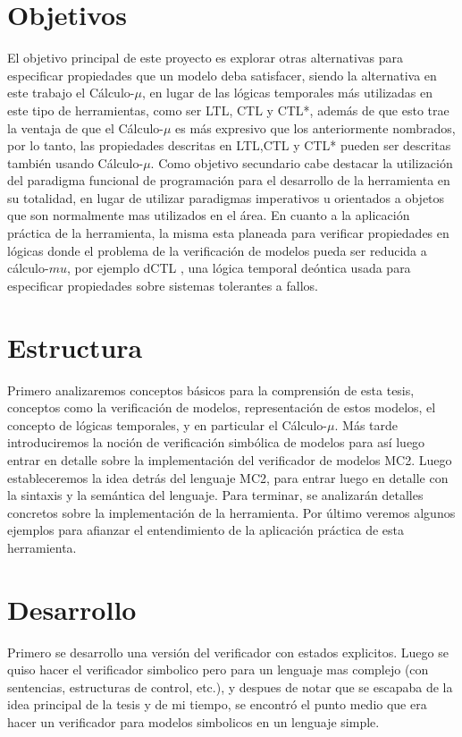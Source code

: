 \section{Objetivos}
El objetivo principal de este proyecto es explorar otras alternativas para especificar propiedades que un modelo deba satisfacer, siendo la alternativa en este trabajo el Cálculo-$\mu$, en lugar de las lógicas temporales más utilizadas en este tipo de herramientas, como ser LTL, CTL y CTL*, además de que esto trae la ventaja de que el Cálculo-$\mu$ es más expresivo que los anteriormente nombrados, por lo tanto, las propiedades descritas en LTL,CTL y CTL* pueden ser descritas también usando Cálculo-$\mu$.
Como objetivo secundario cabe destacar la utilización del paradigma funcional de programación para el desarrollo de la herramienta en su totalidad, en lugar de utilizar paradigmas imperativos u orientados a objetos que son normalmente mas utilizados en el área. En cuanto a la aplicación práctica de la herramienta, la misma esta planeada para verificar propiedades en lógicas donde el problema de la verificación de modelos pueda ser reducida a cálculo-$mu$, por ejemplo dCTL \cite{Castro:9}, una lógica temporal deóntica usada para especificar propiedades sobre sistemas tolerantes a fallos.

\section{Estructura}
Primero analizaremos conceptos básicos para la comprensión de esta tesis, conceptos como la verificación de modelos, representación de estos modelos, el concepto de lógicas temporales, y en particular el Cálculo-$\mu$.
Más tarde introduciremos la noción de verificación simbólica de modelos para así luego entrar en detalle sobre la implementación del verificador de modelos MC2.
Luego estableceremos la idea detrás del lenguaje MC2, para entrar luego en detalle con la sintaxis y la semántica del lenguaje. Para terminar, se analizarán detalles concretos sobre la implementación de la herramienta. 
Por último veremos algunos ejemplos para afianzar el entendimiento de la aplicación práctica de esta herramienta.

\section{Desarrollo}
Primero se desarrollo una versión del verificador con estados explicitos. Luego se quiso hacer el verificador simbolico pero para un lenguaje mas complejo (con sentencias, estructuras de control, etc.), y despues de notar que se escapaba de la idea principal de la tesis y de mi tiempo, se encontró el punto medio que era hacer un verificador para modelos simbolicos en un lenguaje simple.


